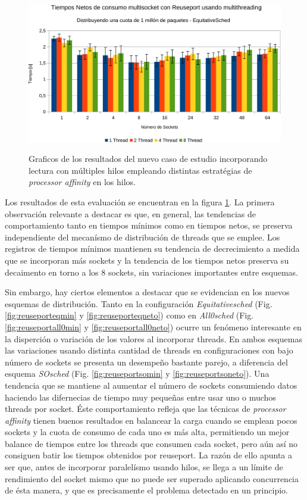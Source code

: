 \begin{figure}[h!]
{		\centering
		\includegraphics[width=.47\textwidth]{resultados/reuseport36-crop.pdf}
		\label{fig:reuseporteqneto}
	}
	\caption{Graficos de los resultados del nuevo caso de estudio incorporando lectura con múltiples hilos empleando distintas estratégias de \emph{processor affinity} en los hilos.}
	\label{fig:resultadosReuseport3}
\end{figure}

Los resultados de esta evaluación se encuentran en la figura \ref{fig:resultadosReuseport3}. La primera observación relevante a destacar es que, en general, las tendencias de comportamiento tanto en tiempos mínimos como en tiempos netos, se preserva independiente del mecanísmo de distribución de threads que se emplee. Los registros de tiempos mínimos mantienen su tendencia de decrecimiento a medida que se incorporan más sockets y la tendencia de los tiempos netos preserva su decaimento en torno a los 8 sockets, sin variaciones importantes entre esquemas.

Sin embargo, hay ciertos elementos a destacar que se evidencian en los nuevos esquemas de distribución. Tanto en la configuración \emph{Equitativesched} (Fig. \ref{fig:reuseporteqmin} y \ref{fig:reuseporteqneto}) como en \emph{All0sched} (Fig. \ref{fig:reuseportall0min} y \ref{fig:reuseportall0neto}) ocurre un fenómeno interesante en la disperción o variación de los valores al incorporar threads. En ambos esquemas las variaciones usando distinta cantidad de threads en configuraciones con bajo número de sockets se presenta un desempeño bastante parejo, a diferencia del esquema \emph{SOsched} (Fig. \ref{fig:reuseportsomin} y \ref{fig:reuseportsoneto}). Una tendencia que se mantiene al aumentar el número de sockets consumiendo datos haciendo las difernecias de tiempo muy pequeñas entre usar uno o muchos threads por socket. Éste comportamiento refleja que las técnicas de \emph{processor affinity} tienen buenos resultados en balancear la carga cuando se emplean pocos sockets y la cuota de consumo de cada uno es más alta, permitiendo un mejor balance de tiempos entre los threads que consumen cada socket, pero aún así no consiguen batir los tiempos obtenidos por reuseport. La razón de ello apunta a ser que, antes de incorporar paralelísmo usando hilos, se llega a un límite de rendimiento del socket mismo que no puede ser superado aplicando concurrencia de ésta manera, y que es precisamente el problema detectado en un principio.

